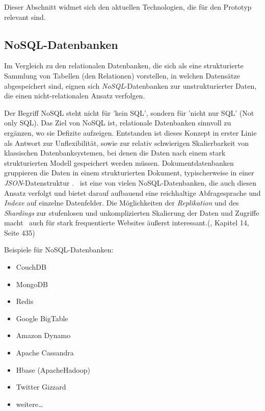 Dieser Abschnitt widmet sich den aktuellen Technologien, die für den Prototyp relevant sind.

\subsection{NoSQL-Datenbanken}

Im Vergleich zu den relationalen Datenbanken, die sich als eine strukturierte Sammlung von Tabellen (den Relationen) vorstellen, in welchen Datensätze abgespeichert sind, eignen sich \textit{NoSQL}-Datenbanken zur unstrukturierter Daten, die einen nicht-relationalen Ansatz verfolgen. 

Der Begriff NoSQL steht nicht für 'kein SQL', sondern für 'nicht nur SQL' (Not only SQL). Das Ziel von NoSQL ist, relationale Datenbanken sinnvoll zu ergänzen, wo sie Defizite aufzeigen. Entstanden ist dieses Konzept in erster Linie als Antwort zur Unflexibilität, sowie zur relativ schwierigen Skalierbarkeit von klassischen Datenbanksystemen, bei denen die Daten nach einem stark strukturierten Modell gespeichert werden müssen. \cite{mySQL} Dokumentdatenbanken gruppieren die Daten in einem strukturierten Dokument, typischerweise in einer \textit{JSON}-Datenstruktur \cite{json}. \mongo\ ist eine von vielen NoSQL-Datenbanken, die auch diesen Ansatz verfolgt und bietet darauf aufbauend eine reichhaltige Abfragesprache und \textit{Indexe} auf einzelne Datenfelder. Die Möglichkeiten der \textit{Replikation} und des \textit{Shardings} zur stufenlosen und unkomplizierten Skalierung der Daten und Zugriffe macht \mongo\ auch für stark frequentierte Websites äußerst interessant.(\cite{Hollosi.2012}, Kapitel 14, Seite 435)

Beispiele für NoSQL-Datenbanken:
\begin{multicols}{2}
\begin{itemize}
\item CouchDB
\item MongoDB
\item Redis
\item Google BigTable
\item Amazon Dynamo
\item Apache Cassandra
\item Hbase (ApacheHadoop)
\item Twitter Gizzard
\item weitere…
\end{itemize}
\end{multicols}

